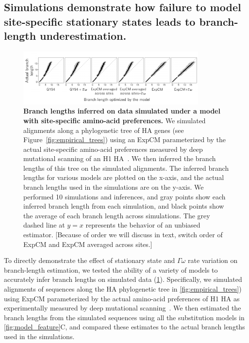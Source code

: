 \documentclass[11pt]{article}
\newcommand\jdbcomment[1]{{\color{red}[#1]}}
\begin{document}
\subsection*{Simulations demonstrate how failure to model site-specific stationary states leads to branch-length underestimation.}
\begin{figure}
\centerline{\includegraphics[width=0.85\textwidth]{figures/simulations}}
\caption{\label{fig:simulations}
\textbf{Branch lengths inferred on data simulated under a model with site-specific amino-acid preferences.} 
We simulated alignments along a phylogenetic tree of HA genes (see Figure~\ref{fig:empirical_trees}) using an ExpCM parameterized by the actual site-specific amino-acid preferences measured by deep mutational scanning of an H1 HA~\citep{doud2016accurate}.
We then inferred the branch lengths of this tree on the simulated alignments.
The inferred branch lengths for various models are plotted on the x-axis, and the actual branch lengths used in the simulations are on the y-axis.
We performed 10 simulations and inferences, and gray points show each inferred branch length from each simulation, and black points show the average of each branch length across simulations.
The grey dashed line at $y=x$ represents the behavior of an unbiased estimator. 
\jdbcomment{Because of order we will discuss in text, switch order of ExpCM and ExpCM averaged across sites.}
}
\end{figure}
To directly demonstrate the effect of stationary state and $\Gamma\omega$ rate variation on branch-length estimation, we tested the ability of a variety of models to accurately infer branch lengths on simulated data (\ref{fig:simulations}).
Specifically, we simulated alignments of sequences along the HA phylogenetic tree in \ref{fig:empirical_trees}) using ExpCM parameterized by the actual amino-acid preferences of H1 HA as experimentally measured by deep mutational scanning~\citep{doud2016accurate}. We then estimated the branch lengths from the simulated sequences using all the substitution models in \ref{fig:model_feature}C, and compared these estimates to the actual branch lengths used in the simulations.
\end{document}
